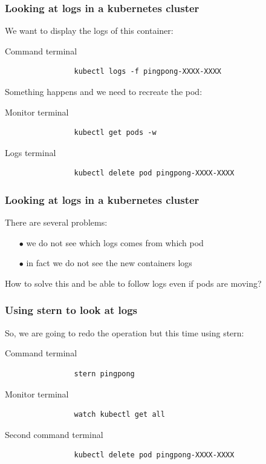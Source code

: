 	\begin{frame}[fragile]
		\frametitle{Looking at logs in a kubernetes cluster}
	
		We want to display the logs of this container:
		\begin{block}{Command terminal}
			\begin{verbatim}
				kubectl logs -f pingpong-XXXX-XXXX
			\end{verbatim}
		\end{block}
		
		Something happens and we need to recreate the pod:
		\begin{block}{Monitor terminal}
			\begin{verbatim}
				kubectl get pods -w
			\end{verbatim}
		\end{block}
		\begin{block}{Logs terminal}
			\begin{verbatim}
				kubectl delete pod pingpong-XXXX-XXXX
			\end{verbatim}
		\end{block}
	\end{frame}
	
	
	\begin{frame}[fragile]
		\frametitle{Looking at logs in a kubernetes cluster}
	
		There are several problems:
		\begin{itemize}
			\item[$\bullet$] we do not see which logs comes from which pod
			\item[$\bullet$] in fact we do not see the new containers logs
		\end{itemize}

		\medskip		
		
		How to solve this and be able to follow logs even if pods are moving?
	\end{frame}

	\begin{frame}[fragile]
		\frametitle{Using stern to look at logs}

		So, we are going to redo the operation but this time using stern:
		\begin{block}{Command terminal}
			\begin{verbatim}
				stern pingpong
			\end{verbatim}
		\end{block}
				\begin{block}{Monitor terminal}
			\begin{verbatim}
				watch kubectl get all
			\end{verbatim}
		\end{block}
		\begin{block}{Second command terminal}
			\begin{verbatim}
				kubectl delete pod pingpong-XXXX-XXXX
			\end{verbatim}
		\end{block}
	\end{frame}
	
